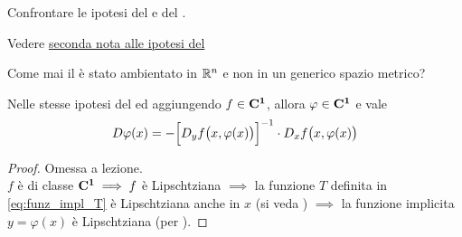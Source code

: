 \begin{exercise}
	Confrontare le ipotesi del  e del .
	\begin{solution}
		Vedere \hyperlink{note:teo_funz_impl_note_ipot1}{seconda nota alle ipotesi del }
	\end{solution}
\end{exercise}
\begin{exercise}
	Come mai il  è stato ambientato in $\mathbb{R}^n$ e non in un generico spazio metrico?
\end{exercise}
\begin{theorem}
	\label{teo:funz_impl_diff}
	Nelle stesse ipotesi del  ed aggiungendo $f \in \mathbf{C^{1}}$, allora $\varphi \in \mathbf{C^{1}}$ e vale
	\begin{equation}
		\label{eq:teo_funz_se_deriv_allora_deriv_tesi}
		D\varphi(x) = - \Bigl[ D_yf \bigl( x, \varphi(x) \bigr) \Bigr]^{-1} \cdot D_xf \bigl( x, \varphi(x) \bigr)
	\end{equation}
	\begin{proof}
		Omessa a lezione.\\
		\color{not_explained_section_color}
		$f$ è di classe $\mathbf{C^{1}} \implies f$ è Lipschtziana $\implies$ la funzione $T$ definita in \cref{eq:funz_impl_T} è Lipschtziana anche in $x$ (si veda ) $\implies$ la funzione implicita $y = \varphi(x)$ è Lipschtziana (per ).


\end{proof}
\end{theorem}

